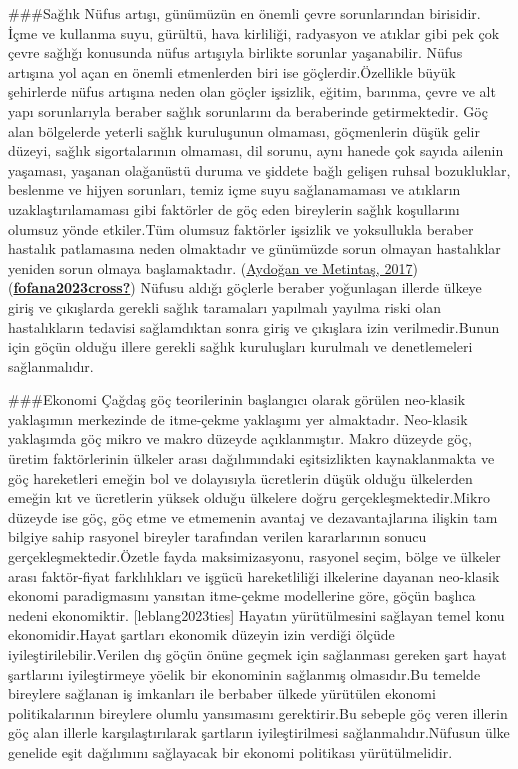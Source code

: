 \documentclass[
  12pt,
]{article}
\begin{document}
\#\#\#Sağlık
Nüfus artışı, günümüzün en önemli çevre sorunlarından birisidir. İçme ve kullanma suyu, gürültü, hava kirliliği, radyasyon ve atıklar gibi pek çok çevre sağlığı konusunda nüfus artışıyla birlikte sorunlar yaşanabilir. Nüfus artışına yol açan en önemli etmenlerden biri ise göçlerdir.Özellikle büyük şehirlerde nüfus artışına neden olan göçler işsizlik, eğitim, barınma, çevre ve alt yapı sorunlarıyla beraber sağlık sorunlarını da beraberinde getirmektedir. Göç alan bölgelerde yeterli sağlık kuruluşunun olmaması, göçmenlerin düşük gelir düzeyi, sağlık sigortalarının olmaması, dil sorunu, aynı hanede çok sayıda ailenin yaşaması, yaşanan olağanüstü duruma ve şiddete bağlı gelişen ruhsal bozukluklar, beslenme ve hijyen sorunları, temiz içme suyu sağlanamaması ve atıkların uzaklaştırılamaması gibi faktörler de göç eden bireylerin sağlık koşullarını olumsuz yönde etkiler.Tüm olumsuz faktörler işsizlik ve yoksullukla beraber hastalık patlamasına neden olmaktadır ve günümüzde sorun olmayan hastalıklar yeniden sorun olmaya başlamaktadır. (\protect\hyperlink{ref-aydougan2017turkiye}{Aydoğan ve Metintaş, 2017}) (\protect\hyperlink{ref-fofana2023cross}{\textbf{fofana2023cross?}}) Nüfusu aldığı göçlerle beraber yoğunlaşan illerde ülkeye giriş ve çıkışlarda gerekli sağlık taramaları yapılmalı yayılma riski olan hastalıkların tedavisi sağlamdıktan sonra giriş ve çıkışlara izin verilmedir.Bunun için göçün olduğu illere gerekli sağlık kuruluşları kurulmalı ve denetlemeleri sağlanmalıdır.

\#\#\#Ekonomi
Çağdaş göç teorilerinin başlangıcı olarak görülen neo-klasik yaklaşımın merkezinde de itme-çekme yaklaşımı yer almaktadır. Neo-klasik yaklaşımda göç mikro ve makro düzeyde açıklanmıştır. Makro düzeyde göç, üretim faktörlerinin ülkeler arası dağılımındaki eşitsizlikten kaynaklanmakta ve göç hareketleri emeğin bol ve dolayısıyla ücretlerin düşük olduğu ülkelerden emeğin kıt ve ücretlerin yüksek olduğu ülkelere doğru gerçekleşmektedir.Mikro düzeyde ise göç, göç etme ve etmemenin avantaj ve dezavantajlarına ilişkin tam bilgiye sahip rasyonel bireyler tarafından verilen kararlarının sonucu gerçekleşmektedir.Özetle fayda maksimizasyonu, rasyonel seçim, bölge ve ülkeler arası faktör-fiyat farklılıkları ve işgücü hareketliliği ilkelerine dayanan neo-klasik ekonomi paradigmasını yansıtan itme-çekme modellerine göre, göçün başlıca nedeni ekonomiktir. {[}leblang2023ties{]} Hayatın yürütülmesini sağlayan temel konu ekonomidir.Hayat şartları ekonomik düzeyin izin verdiği ölçüde iyileştirilebilir.Verilen dış göçün önüne geçmek için sağlanması gereken şart hayat şartlarını iyileştirmeye yöelik bir ekonominin sağlanmış olmasıdır.Bu temelde bireylere sağlanan iş imkanları ile berbaber ülkede yürütülen ekonomi politikalarının bireylere olumlu yansımasını gerektirir.Bu sebeple göç veren illerin göç alan illerle karşılaştırılarak şartların iyileştirilmesi sağlanmalıdır.Nüfusun ülke genelide eşit dağılımını sağlayacak bir ekonomi politikası yürütülmelidir.
\end{document}
